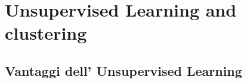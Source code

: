%
%
%

\chapter{Unsupervised Learning and clustering}
\section{Vantaggi dell' Unsupervised Learning}
